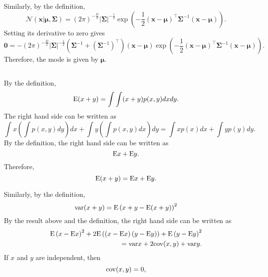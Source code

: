 Similarly, by the definition,
%
\begin{equation}
\mathcal{N} \left( \mathbf{x} | \bm{\mu}, \bm{\Sigma} \right) = \left( 2 \pi \right) ^ {- \frac{D}{2}} |\bm{\Sigma}| ^ {- \frac{1}{2}} \exp \left( - \frac{1}{2} (\mathbf{x} - \bm{\mu}) ^ \intercal \bm{\Sigma} ^ {- 1} (\mathbf{x} - \bm{\mu}) \right).
\end{equation}
%
Setting its derivative to zero gives
%
\begin{equation}
\mathbf{0} = - \left( 2 \pi \right) ^ {- \frac{D}{2}} |\bm{\Sigma}| ^ {- \frac{1}{2}} \left( \bm{\Sigma} ^ {- 1} + \left( \bm{\Sigma} ^ {- 1} \right) ^ \intercal \right) (\mathbf{x} - \bm{\mu}) \exp \left( - \frac{1}{2} (\mathbf{x} - \bm{\mu}) ^ \intercal \bm{\Sigma} ^ {- 1} (\mathbf{x} - \bm{\mu}) \right).
\end{equation}
%
Therefore, the mode is given by $\bm{\mu}$.


\subsection{}
By the definition,
%
\begin{equation}
{\rm E} (x + y) = \int \int (x + y) p(x, y) dx dy.
\end{equation}
%
The right hand side can be written as 
%
\begin{equation}
\int x \left( \int p(x, y) dy \right) dx + \int y \left( \int p(x, y) dx \right) dy = \int x p(x) dx + \int y p(y) dy.
\end{equation}
%
By the definition, the right hand side can be written as 
%
\begin{equation}
{\rm E} x + {\rm E} y.
\end{equation}
%
Therefore, 
%
\begin{equation}
{\rm E} (x + y) = {\rm E} x + {\rm E} y.
\end{equation}
%

Similarly, by the definition,
%
\begin{equation}
{\rm var} (x + y) = {\rm E} \left( x + y - {\rm E} (x + y) \right) ^ 2
\end{equation}
%
By the result above and the definition, the right hand side can be written as 
%
\begin{equation}
\begin{aligned}
{\rm E} \left( x - {\rm E} x \right) ^ 2 + 2 {\rm E} \left( \left( x - {\rm E} x \right) \left( y - {\rm E} y \right) \right) + {\rm E} \left( y - {\rm E} y \right) ^ 2 \\
= {\rm var} x + 2 {\rm cov} (x, y) + {\rm var} y.
\end{aligned}
\end{equation}
%
If $x$ and $y$ are independent, then 
%
\begin{equation}
{\rm cov} (x, y) = 0,
\end{equation}

